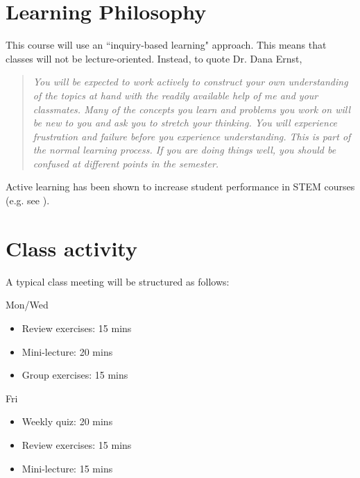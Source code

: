 \documentclass[letterpaper]{inzane_syllabus} %
\begin{document}


\vspace{0.2cm} 
\section{Learning Philosophy}

This course will use an ``inquiry-based learning" approach. This means that classes will not be lecture-oriented. Instead, to quote Dr. Dana Ernst,

\begin{quotation}
\textit{You will be expected to work actively to construct your own understanding of the topics at hand with the readily available help of me and your classmates. Many of the concepts you learn and problems you work on will be new to you and ask you to stretch your thinking. You will experience frustration and failure before you experience understanding. This is part of the normal learning process. If you are doing things well, you should be confused at different points in the semester.}
\end{quotation}

Active learning has been shown to increase student performance in STEM courses (e.g. see \cite{deslauriers2011improved, freeman2014active}). 

\vspace{0.2cm}
\section{Class activity}

A typical class meeting will be structured as follows:

\noindent
\begin{minipage}{0.45\textwidth}
Mon/Wed
\begin{itemize}
\item Review exercises: 15 mins
\item Mini-lecture: 20 mins
\item Group exercises: 15 mins	
\end{itemize}
\end{minipage}
\hfill
\begin{minipage}{0.45\textwidth}
Fri
\begin{itemize}
\item Weekly quiz: 20 mins
\item Review exercises: 15 mins
\item Mini-lecture: 15 mins
\end{itemize}
\end{minipage}
\end{document}
